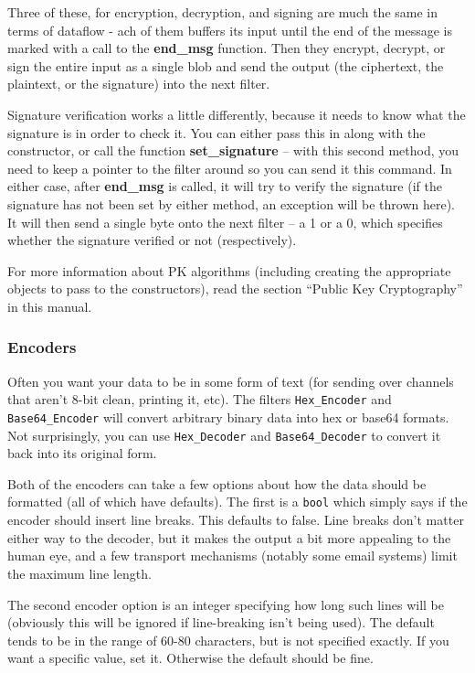 \documentclass{article}
\newcommand{\function}[1]{\textbf{#1}}
\newcommand{\type}[1]{\texttt{#1}}
\begin{document}
Three of these, for encryption, decryption, and signing are much the
same in terms of dataflow - ach of them buffers its input until the
end of the message is marked with a call to the \function{end\_msg}
function. Then they encrypt, decrypt, or sign the entire input as a
single blob and send the output (the ciphertext, the plaintext, or the
signature) into the next filter.

Signature verification works a little differently, because it needs to
know what the signature is in order to check it. You can either pass
this in along with the constructor, or call the function
\function{set\_signature} -- with this second method, you need to keep
a pointer to the filter around so you can send it this command. In
either case, after \function{end\_msg} is called, it will try to
verify the signature (if the signature has not been set by either
method, an exception will be thrown here). It will then send a single
byte onto the next filter -- a 1 or a 0, which specifies whether the
signature verified or not (respectively).

For more information about PK algorithms (including creating the
appropriate objects to pass to the constructors), read the section
``Public Key Cryptography'' in this manual.

\subsubsection{Encoders}

Often you want your data to be in some form of text (for sending over channels
that aren't 8-bit clean, printing it, etc). The filters \type{Hex\_Encoder}
and \type{Base64\_Encoder} will convert arbitrary binary data into hex or
base64 formats. Not surprisingly, you can use \type{Hex\_Decoder} and
\type{Base64\_Decoder} to convert it back into its original form.

Both of the encoders can take a few options about how the data should be
formatted (all of which have defaults). The first is a \type{bool} which simply
says if the encoder should insert line breaks. This defaults to
false. Line breaks don't matter either way to the decoder, but it makes the
output a bit more appealing to the human eye, and a few transport mechanisms
(notably some email systems) limit the maximum line length.

The second encoder option is an integer specifying how long such lines will be
(obviously this will be ignored if line-breaking isn't being used). The default
tends to be in the range of 60-80 characters, but is not specified exactly. If
you want a specific value, set it. Otherwise the default should be fine.
\end{document}
